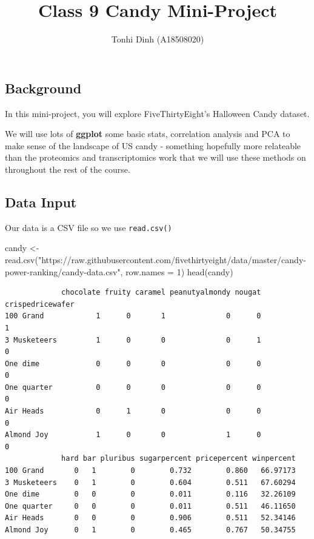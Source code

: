 \documentclass[
  letterpaper,
  DIV=11,
  numbers=noendperiod]{scrartcl}
\title{Class 9 Candy Mini-Project}
\author{Tonhi Dinh (A18508020)}
\date{}
\newenvironment{Shaded}{\begin{snugshade}}{\end{snugshade}}
\newcommand{\AttributeTok}[1]{\textcolor[rgb]{0.40,0.45,0.13}{#1}}
\newcommand{\DecValTok}[1]{\textcolor[rgb]{0.68,0.00,0.00}{#1}}
\newcommand{\FunctionTok}[1]{\textcolor[rgb]{0.28,0.35,0.67}{#1}}
\newcommand{\NormalTok}[1]{\textcolor[rgb]{0.00,0.23,0.31}{#1}}
\newcommand{\OtherTok}[1]{\textcolor[rgb]{0.00,0.23,0.31}{#1}}
\newcommand{\StringTok}[1]{\textcolor[rgb]{0.13,0.47,0.30}{#1}}
\renewcommand*\contentsname{Table of contents}
\newcommand\contentsname{Table of contents}
\begin{document}
\maketitle

\renewcommand*\contentsname{Table of contents}
{
\hypersetup{linkcolor=}
\setcounter{tocdepth}{3}
\tableofcontents
}

\subsection{Background}\label{background}

In this mini-project, you will explore FiveThirtyEight's Halloween Candy
dataset.

We will use lots of \textbf{ggplot} some basic stats, correlation
analysis and PCA to make sense of the landscape of US candy - something
hopefully more relateable than the proteomics and transcriptomics work
that we will use these methods on throughout the rest of the course.

\subsection{Data Input}\label{data-input}

Our data is a CSV file so we use \texttt{read.csv()}

\begin{Shaded}
\begin{Highlighting}[]
\NormalTok{candy }\OtherTok{\textless{}{-}} \FunctionTok{read.csv}\NormalTok{(}\StringTok{"https://raw.githubusercontent.com/fivethirtyeight/data/master/candy{-}power{-}ranking/candy{-}data.csv"}\NormalTok{, }\AttributeTok{row.names =} \DecValTok{1}\NormalTok{)}
\FunctionTok{head}\NormalTok{(candy)}
\end{Highlighting}
\end{Shaded}

\begin{verbatim}
             chocolate fruity caramel peanutyalmondy nougat crispedricewafer
100 Grand            1      0       1              0      0                1
3 Musketeers         1      0       0              0      1                0
One dime             0      0       0              0      0                0
One quarter          0      0       0              0      0                0
Air Heads            0      1       0              0      0                0
Almond Joy           1      0       0              1      0                0
             hard bar pluribus sugarpercent pricepercent winpercent
100 Grand       0   1        0        0.732        0.860   66.97173
3 Musketeers    0   1        0        0.604        0.511   67.60294
One dime        0   0        0        0.011        0.116   32.26109
One quarter     0   0        0        0.011        0.511   46.11650
Air Heads       0   0        0        0.906        0.511   52.34146
Almond Joy      0   1        0        0.465        0.767   50.34755
\end{verbatim}
\end{document}
